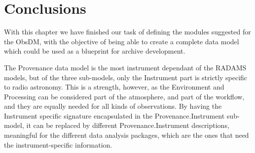 		
	
	
	\section{Conclusions} %
	\label{sec:data_provenance_conclusions}
		
		With this chapter we have finished our task of defining
		the modules suggested for the ObsDM, with the objective
		of being able to create a complete data model which
		could be used as a blueprint for archive development.
		
		The Provenance data model is the most instrument dependant
		of the RADAMS models, but of the three sub-models, only
		the Instrument part is strictly specific to radio astronomy.
		This is a strength, however, as the Environment and 
		Processing can be considered part of the atmosphere, and
		part of the workflow, and they are equally needed for all
		kinds of observations. By having the Instrument specific
		signature encapsulated in the Provenance.Instrument
		sub-model, it can be replaced by different
		Provenance.Instrument descriptions, 
		meaningful for the different data analysis packages, which
		are the ones that need the instrument-specific
		information.
	
		
		
	
